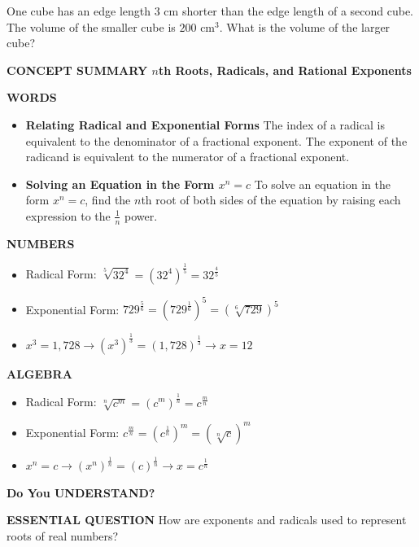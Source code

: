 \documentclass{article}
\newenvironment{concept-summary}{}{}
\newenvironment{tryit}[1]{}{}
\newenvironment{practice}[2]{}{}
\begin{document}
\begin{tryit}{6}
One cube has an edge length $3 \text{ cm}$ shorter than the edge length of a second cube. The volume of the smaller cube is $200 \text{ cm}^3$. What is the volume of the larger cube?
\end{tryit}

\begin{concept-summary}
\textbf{CONCEPT SUMMARY $n$th Roots, Radicals, and Rational Exponents}

\textbf{WORDS}
\begin{itemize}
    \item \textbf{Relating Radical and Exponential Forms}
    The index of a radical is equivalent to the denominator of a fractional exponent. The exponent of the radicand is equivalent to the numerator of a fractional exponent.
    \item \textbf{Solving an Equation in the Form $x^n = c$}
    To solve an equation in the form $x^n = c$, find the $n$th root of both sides of the equation by raising each expression to the $\frac{1}{n}$ power.
\end{itemize}

\textbf{NUMBERS}
\begin{itemize}
    \item Radical Form: $\sqrt[5]{32^4} = (32^4)^{\frac{1}{5}} = 32^{\frac{4}{5}}$
    \item Exponential Form: $729^{\frac{5}{6}} = (729^{\frac{1}{6}})^5 = (\sqrt[6]{729})^5$
    \item $x^3 = 1,728 \rightarrow (x^3)^{\frac{1}{3}} = (1,728)^{\frac{1}{3}} \rightarrow x = 12$
\end{itemize}

\textbf{ALGEBRA}
\begin{itemize}
    \item Radical Form: $\sqrt[n]{c^m} = (c^m)^{\frac{1}{n}} = c^{\frac{m}{n}}$
    \item Exponential Form: $c^{\frac{m}{n}} = (c^{\frac{1}{n}})^m = (\sqrt[n]{c})^m$
    \item $x^n = c \rightarrow (x^n)^{\frac{1}{n}} = (c)^{\frac{1}{n}} \rightarrow x = c^{\frac{1}{n}}$
\end{itemize}
\end{concept-summary}

\textbf{Do You UNDERSTAND?}

\begin{practice}{1}{}
\textbf{ESSENTIAL QUESTION} How are exponents and radicals used to represent roots of real numbers?
\end{practice}
\end{document}
